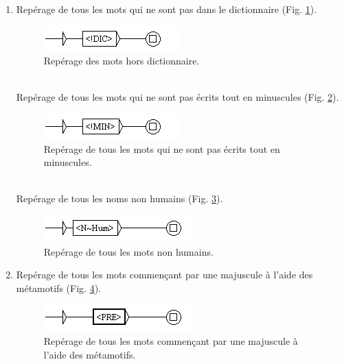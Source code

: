 \documentclass[xcolor={table,usenames,dvipsnames}]{article}
\begin{document}
\begin{enumerate}
		\bigskip
	\\
	\item Repérage de tous les mots qui ne sont pas dans le dictionnaire (Fig. \ref{fig:dic}).
					\begin{figure}[H] %
		\centering
		\includegraphics[width=.7\linewidth]{img/dic.png}
		\caption{Repérage des mots hors dictionnaire.}
		\label{fig:dic}
	\end{figure}
	
	\bigskip
	\\
	
	Repérage de tous les mots qui ne sont pas écrits tout en minuscules (Fig. \ref{fig:min}).
						\begin{figure}[H] %
		\centering
		\includegraphics[width=.7\linewidth]{img/min.png}
		\caption{Repérage de tous les mots qui ne sont pas écrits tout en minuscules.}
		\label{fig:min}
	\end{figure}
	
	\bigskip
	\\
	
	Repérage de tous les noms non humains (Fig. \ref{fig:negation}).
							\begin{figure}[H] %
		\centering
		\includegraphics[width=.7\linewidth]{img/negation.png}
		\caption{Repérage de tous les mots non humains.}
		\label{fig:negation}
	\end{figure}
	
	\item Repérage de tous les mots commençant par une majuscule à l'aide des métamotifs (Fig. \ref{fig:majuscule}).
		\begin{figure}[H] %
		\centering
		\includegraphics[width=.7\linewidth]{img/majuscule.png}
		\caption{Repérage de tous les mots commençant par une majuscule à l'aide des métamotifs.}
		\label{fig:majuscule}
	\end{figure}
	

\end{enumerate}
\end{document}
